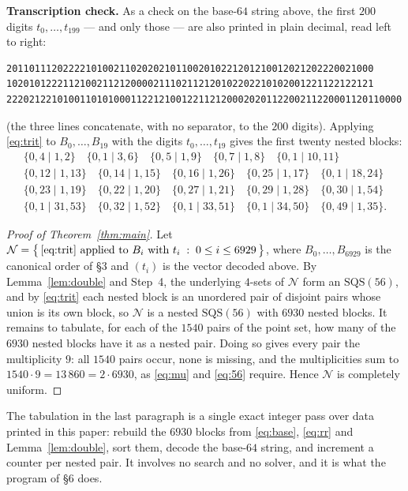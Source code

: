 \documentclass[11pt]{amsart}
\newcommand{\SQS}{\mathrm{SQS}}
\begin{document}
\noindent\textbf{Transcription check.} As a check on the base-$64$ string above,
the first $200$ digits $t_0,\ldots,t_{199}$ --- and only those --- are also
printed in plain decimal, read left to right:

\begingroup\scriptsize
\begin{verbatim}
20110111202222101002110202021011002010221201210012021202220021000
10201012221121002112120000211102112120102202210102001221122122121
2220212210100110101000112212100122112120002020112200211220001120110000
\end{verbatim}
\endgroup

\noindent (the three lines concatenate, with no separator, to the $200$
digits). Applying \eqref{eq:trit} to $B_0,\ldots,B_{19}$ with the digits
$t_0,\ldots,t_{19}$ gives the first twenty nested blocks:
\begin{gather*}
 \{0,4\mid1,2\}\quad \{0,1\mid3,6\}\quad \{0,5\mid1,9\}\quad
 \{0,7\mid1,8\}\quad \{0,1\mid10,11\}\\
 \{0,12\mid1,13\}\quad \{0,14\mid1,15\}\quad \{0,16\mid1,26\}\quad
 \{0,25\mid1,17\}\quad \{0,1\mid18,24\}\\
 \{0,23\mid1,19\}\quad \{0,22\mid1,20\}\quad \{0,27\mid1,21\}\quad
 \{0,29\mid1,28\}\quad \{0,30\mid1,54\}\\
 \{0,1\mid31,53\}\quad \{0,32\mid1,52\}\quad \{0,1\mid33,51\}\quad
 \{0,1\mid34,50\}\quad \{0,49\mid1,35\}.
\end{gather*}

\begin{proof}[Proof of Theorem~\ref{thm:main}]
Let $\mathcal N=\bigl\{\,\eqref{eq:trit}\text{ applied to }B_i\text{ with
}t_i \;:\; 0\le i\le 6929\,\bigr\}$, where $B_0,\ldots,B_{6929}$ is the
canonical order of \S3 and $(t_i)$ is the vector decoded above. By
Lemma~\ref{lem:double} and Step~4, the underlying $4$-sets of $\mathcal N$ form
an $\SQS(56)$, and by \eqref{eq:trit} each nested block is an unordered pair of
disjoint pairs whose union is its own block, so $\mathcal N$ is a nested
$\SQS(56)$ with $6930$ nested blocks. It remains to tabulate, for each of the
$1540$ pairs of the point set, how many of the $6930$ nested blocks have it as a
nested pair. Doing so gives every pair the multiplicity $9$: all $1540$ pairs
occur, none is missing, and the multiplicities sum to
$1540\cdot9=13\,860=2\cdot6930$, as \eqref{eq:mu} and \eqref{eq:56} require.
Hence $\mathcal N$ is completely uniform.
\end{proof}

The tabulation in the last paragraph is a single exact integer pass over data
printed in this paper: rebuild the $6930$ blocks from \eqref{eq:base},
\eqref{eq:rr} and Lemma~\ref{lem:double}, sort them, decode the base-$64$
string, and increment a counter per nested pair. It involves no search and no
solver, and it is what the program of \S6 does.
\end{document}
